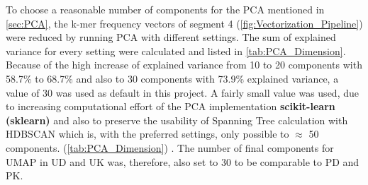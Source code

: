 To choose a reasonable number of components for the \gls{PCA} mentioned in \autoref{sec:PCA}, the k-mer frequency vectors of segment 4 (\autoref{fig:Vectorization_Pipeline}) were reduced by running \gls{PCA} with different settings. The sum of explained variance for every setting were calculated and listed in \autoref{tab:PCA_Dimension}. Because of the high increase of explained variance from 10 to 20 components with 58.7\% to 68.7\% and also to 30 components with 73.9\% explained variance, a value of 30 was used as default in this project. A fairly small value was used, due to increasing computational effort of the \gls{PCA} implementation \textbf{scikit-learn (sklearn)} and also to preserve the usability of Spanning Tree calculation with \gls{HDBSCAN} which is, with the preferred settings, only possible to $\approx$ 50 components. (\autoref{tab:PCA_Dimension}) \autocite{mcinnes_hdbscan_2017, scipy_10_contributors_scipy_2020}. The number of final components for \gls{UMAP} in UD and UK was, therefore, also set to 30 to be comparable to PD and PK.

\begin{table}[!hbt]
    \centering
    \caption[Explained Variance by different PCA settings]{\textbf{Explained Variance by different PCA settings.} The explained variance of specific \gls{PCA} settings used on the k-mer frequency vectors of segment 4. A result of 0.587 as for 10 components represents 58.7\% of the variance is explained by the first 10 components of the vector. The more components are extracted the lower the increase in additional explained variance \autocite{pearson_liii_1901}.}
    \label{tab:PCA_Dimension}
\end{table}

